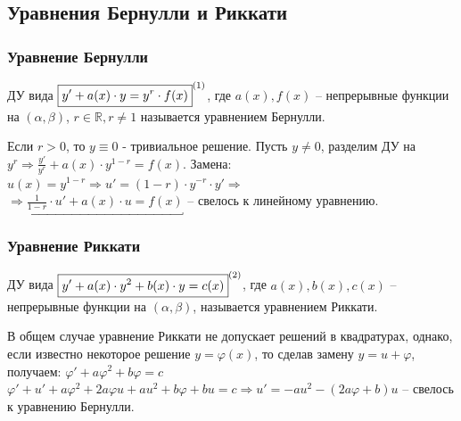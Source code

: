 \subsection{Уравнения Бернулли и Риккати}
\subsubsection{Уравнение Бернулли}

\begin{definition}
	ДУ вида $ \boxed{y' + a(x)\cdot y = y^r \cdot f(x)}^{\eqnum\label{eq:Ber}} $, где $a(x), f(x)$ -- непрерывные функции на $(\alpha, \beta)$, $r \in \mathbb{ R }, r \neq 1$ называется уравнением Бернулли. \\
\end{definition}

\begin{proposition} %
	Если $ r > 0 $, то $ y \equiv 0 $ - тривиальное решение. Пусть $ y \neq 0$, разделим ДУ на $ y^r \Rightarrow \frac{ y' }{ y^r } + a(x) \cdot y^{ 1-r } = f(x).$ Замена: $ u(x) = y^{ 1-r } \Rightarrow u' = ( 1-r ) \cdot y^{ -r } \cdot y' \Rightarrow$ \\ $\Rightarrow \underbracket{ \frac{ 1 }{ 1-r } \cdot u' + a(x)\cdot u = f(x) }$ -- свелось к линейному уравнению. 
\end{proposition}

\subsubsection{Уравнение Риккати}

\begin{definition}
	ДУ вида $ \boxed{y' + a(x) \cdot y^2 + b(x) \cdot y = c(x)}^{\eqnum\label{eq:Ric}} $, где $a(x), b(x), c(x)$ -- непрерывные функции на $(\alpha, \beta)$, называется уравнением Риккати. 
\end{definition}

\begin{proposition}	
	В общем случае уравнение Риккати не допускает решений в квадратурах, однако, если известно некоторое решение $ y = \varphi (x) $, то сделав замену $ y = u + \varphi $, получаем: $ \varphi' + a \varphi^2 + b\varphi = c $ \\ $ \varphi' + u' + a \varphi^2 + 2 a\varphi u + au^2 + b\varphi + bu = c \Rightarrow u' = - au^2 - (2a\varphi + b)u $ -- свелось к уравнению Бернулли.
\end{proposition}

